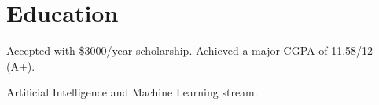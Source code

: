 \section{Education}


Accepted with \$3000/year scholarship. Achieved a major CGPA of 11.58/12 (A+).

Artificial Intelligence and Machine Learning stream.
